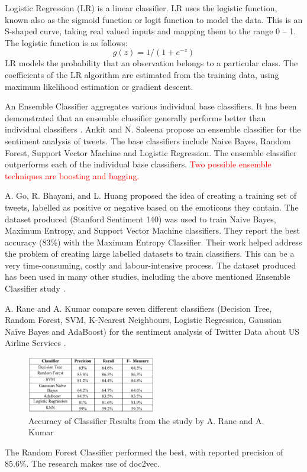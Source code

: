 Logistic Regression (LR) is a linear classifier. LR uses the logistic function, known also as the sigmoid function or logit function to model the data. This is an S-shaped curve, taking real valued inputs and mapping them to the range 0 – 1. The logistic function is as follows: \[g(z)=1/(1+e^{-z})\]
LR models the probability that an observation belongs to a particular class. The coefficients of the LR algorithm are estimated from the training data, using maximum likelihood estimation or gradient descent.

An Ensemble Classifier aggregates various individual base classifiers. It has been demonstrated that an ensemble classifier generally performs better than individual classifiers \cite{Opitz1999}. Ankit and N. Saleena \cite{Ankit2018} propose an ensemble classifier for the sentiment analysis of tweets. The base classifiers include Naive Bayes, Random Forest, Support Vector Machine and Logistic Regression. The ensemble classifier outperforms each of the individual base classifiers.
\textcolor{red}{Two possible ensemble techniques are boosting and bagging.}

A. Go, R. Bhayani, and L. Huang \cite{Go2009} proposed the  idea of creating a training set of tweets, labelled as positive or negative based on the emoticons they contain. The dataset produced (Stanford Sentiment 140) was used to train Naive Bayes, Maximum Entropy, and Support Vector Machine classifiers. They report the best accuracy (83\%) with the Maximum Entropy Classifier. Their work helped address the problem of creating large labelled datasets to train classifiers. This can be a very time-consuming, costly and labour-intensive process. The dataset produced has been used in many other studies, including the above mentioned Ensemble Classifier study \cite{Ankit2018}.

A. Rane and A. Kumar compare seven different classifiers (Decision Tree, Random Forest, SVM, K-Nearest Neighbours, Logistic Regression, Gaussian Naïve Bayes and AdaBoost) for the sentiment analysis of Twitter Data about US Airline Services \cite{Rane2018}. 
\begin{figure}
    \centering
    \includegraphics[width=0.5\textwidth]{literature_review/arane_classifier_results.PNG}
    \caption{Accuracy of Classifier Results from the study by A. Rane and A. Kumar \cite{Rane2018}}
\end{figure}
The Random Forest Classifier performed the best, with reported precision of 85.6\%. The research makes use of doc2vec.

